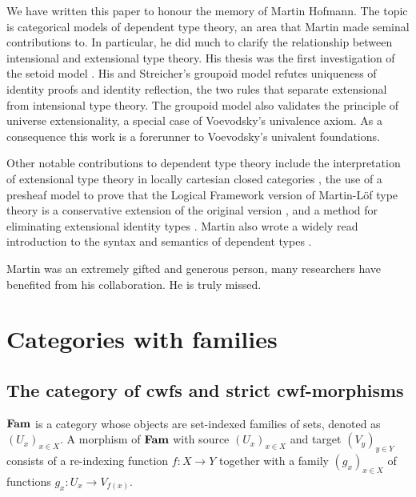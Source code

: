 \documentclass{lmcs}
\def\Cwf{\mathbf{CwF}}
\begin{document}
We have written this paper to honour the memory of Martin Hofmann. The topic is categorical models of dependent type theory, an area that Martin made seminal contributions to. In particular, he did much to clarify the relationship between intensional and extensional type theory.
His thesis was the first investigation of the setoid model \cite{hofmann:phd}. His and Streicher's groupoid model \cite{hofmann:groupoid} refutes uniqueness of identity proofs and identity reflection, the two rules that separate extensional from intensional type theory. The groupoid model also validates the principle of universe extensionality, a special case of Voevodsky's univalence axiom. As a consequence this work is a forerunner to Voevodsky's univalent foundations.

Other notable contributions to dependent type theory include the interpretation of extensional type theory in locally cartesian closed categories \cite{hofmann:csl,curien-garner-hofmann}, the use of a presheaf model to prove that the Logical Framework version of Martin-Löf type theory is a conservative extension of the original version \cite{hofmann:cambridge}, and a method for eliminating extensional identity types \cite{hofmann:conservativity}. Martin also wrote a widely read introduction to the syntax and semantics of dependent types \cite{hofmann:cambridge}.

Martin was an extremely gifted and generous person,
many researchers have benefited from his collaboration.
He is truly missed.

\section{Categories with families}\label{sec:def_cwf}

\subsection{The category of cwfs and strict cwf-morphisms}


\begin{definition}\label{def:catFam}
$\textbf{Fam}$ is a category whose objects are
set-indexed families of sets, denoted as $(U_x)_{x\in X}$.
A morphism of $\textbf{Fam}$ with source $(U_x)_{x\in X}$ and target $(V_y)_{y\in Y}$
consists of a re-indexing function $f: X\to Y$ together with a family
$(g_x)_{x\in X}$ of functions $g_x : U_x \to V_{f(x)}$. %
\end{definition}
\end{document}

